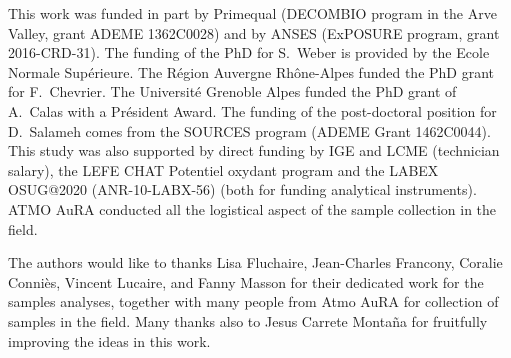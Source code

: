 \documentclass[acp, manuscript]{copernicus}
\begin{document}
%







\begin{acknowledgements}
This work was funded in part by Primequal (DECOMBIO program in the Arve Valley,
grant ADEME 1362C0028) and by ANSES (ExPOSURE program, grant 2016-CRD-31). The
funding of the PhD for S.~Weber is provided by the Ecole Normale Sup\'{e}rieure.
The R\'{e}gion Auvergne Rh\^{o}ne-Alpes funded the PhD grant for F.~Chevrier. The
Universit\'{e} Grenoble Alpes funded the PhD grant of A.~Calas with a
Pr\'{e}sident Award. The funding of the post-doctoral position for D.~Salameh
comes from the SOURCES program (ADEME Grant 1462C0044). This study was also
supported by direct funding by IGE and LCME (technician salary), the LEFE CHAT
Potentiel oxydant program and the LABEX OSUG@2020 (ANR-10-LABX-56) (both for
funding analytical instruments).  ATMO AuRA conducted all the logistical aspect
of the sample collection in the field.

The authors would like to thanks Lisa Fluchaire, Jean-Charles Francony, Coralie
Conni\`{e}s, Vincent Lucaire, and Fanny Masson for their dedicated work for the
samples analyses, together with many people from Atmo AuRA for collection of
samples in the field. Many thanks also to Jesus Carrete Monta\~{n}a for fruitfully
improving the ideas in this work.
\end{acknowledgements}






%
%
%
\end{document}
